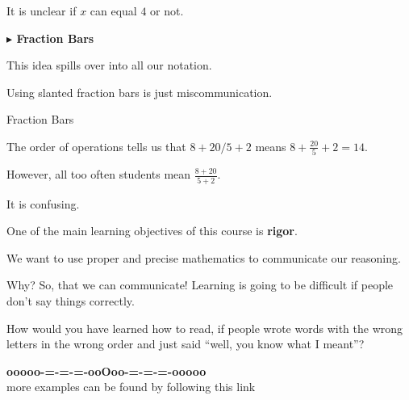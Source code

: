 \documentclass{ximera}
\begin{document}
It is unclear if $x$ can equal $4$ or not.




\textbf{\textcolor{blue!55!black}{$\blacktriangleright$ Fraction Bars}}

This idea spills over into all our notation.

Using slanted fraction bars is just miscommunication.




\begin{example} Fraction Bars

The order of operations tells us that $8+20/5+2$ means $8 + \frac{20}{5} + 2 = 14$.

However, all too often students mean $\frac{8+20}{5+2} $.

It is confusing.

\end{example}



One of the main learning objectives of this course is \textbf{\textcolor{blue!55!black}{rigor}}.


We want to use proper and precise mathematics to communicate our reasoning.

Why? So, that we can communicate!  Learning is going to be difficult if people don't say things correctly.

How would you have learned how to read, if people wrote words with the wrong letters in the wrong order and just said ``well, you know what I meant''?






























\begin{onlineOnly}
\begin{center}
\textbf{\textcolor{green!50!black}{ooooo-=-=-=-ooOoo-=-=-=-ooooo}} \\

more examples can be found by following this link\\ 

\end{center}
\end{onlineOnly}
\end{document}
